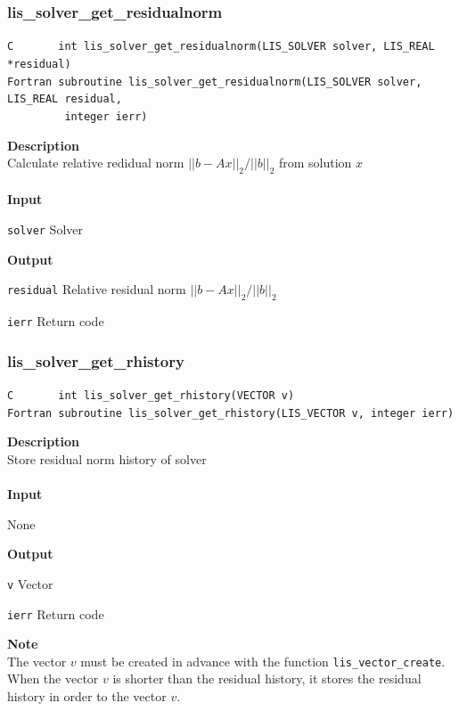 \documentclass[a4paper]{article}
\newcommand{\namelistlabel}[1]{\mbox{#1}\hfill}
\newenvironment{namelist}[1]{%
 \begin{list}{}
  {\let\makelabel\namelistlabel
  \settowidth{\labelwidth}{#1}
  \setlength{\leftmargin}{1.1\labelwidth}}
}{%
\end{list}}
\begin{document}
  \subsubsection{lis\_solver\_get\_residualnorm}
\begin{screen}
\verb|C       int lis_solver_get_residualnorm(LIS_SOLVER solver, LIS_REAL *residual)|\\
\verb|Fortran subroutine lis_solver_get_residualnorm(LIS_SOLVER solver, LIS_REAL residual,|\\
\verb|         integer ierr)|
\end{screen}
{\bf Description}\\
\indent
Calculate relative redidual norm $||b - Ax||_2 / ||b||_2$ from solution $x$
\\ \\
\noindent
{\bf Input}
\begin{namelist}{XXXXXXXXXXXXXXXXXXXX}
\item[\tt solver] Solver
\end{namelist}
{\bf Output}
\begin{namelist}{XXXXXXXXXXXXXXXXXXXX}
\item[\tt residual]  Relative residual norm $||b - Ax||_2 / ||b||_2$
\item[\tt ierr] Return code
\end{namelist}
\newpage
  \subsubsection{lis\_solver\_get\_rhistory}
\begin{screen}
\verb|C       int lis_solver_get_rhistory(VECTOR v)|\\
\verb|Fortran subroutine lis_solver_get_rhistory(LIS_VECTOR v, integer ierr)|
\end{screen}
{\bf Description}\\
\indent
Store residual norm history of solver
\\ \\
\noindent
{\bf Input}
\begin{namelist}{XXXXXXXXXXXXXXXXXXXX}
\item[None]
\end{namelist}
{\bf Output}
\begin{namelist}{XXXXXXXXXXXXXXXXXXXX}
\item[\tt v] Vector
\item[\tt ierr] Return code
\end{namelist}
{\bf Note}\\
\indent
The vector $v$ must be created in advance with the function \verb|lis_vector_create|. 
When the vector $v$ is shorter than the residual history, 
it stores the residual history in order to the vector $v$.
\newpage
\end{document}
